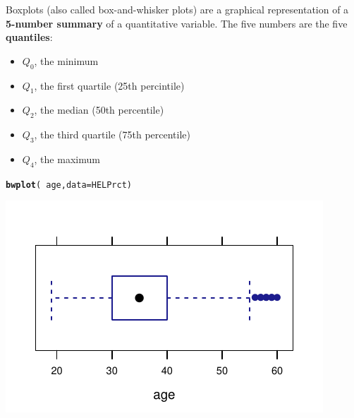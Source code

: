 \documentclass[twoside]{book}\usepackage[]{graphicx}\usepackage[]{xcolor}
\makeatletter
\def\maxwidth{ %
  \ifdim\Gin@nat@width>\linewidth
    \linewidth
  \else
    \Gin@nat@width
  \fi
}
\newcommand{\hlopt}[1]{\textcolor[rgb]{0,0,0}{#1}}%
\newcommand{\hlstd}[1]{\textcolor[rgb]{0.345,0.345,0.345}{#1}}%
\newcommand{\hlkwc}[1]{\textcolor[rgb]{0.333,0.667,0.333}{#1}}%
\newcommand{\hlkwd}[1]{\textcolor[rgb]{0.737,0.353,0.396}{\textbf{#1}}}%
\newenvironment{kframe}{%
 \def\at@end@of@kframe{}%
 \ifinner\ifhmode%
  \def\at@end@of@kframe{\end{minipage}}%
  \begin{minipage}{\columnwidth}%
 \fi\fi%
 \def\FrameCommand##1{\hskip\@totalleftmargin \hskip-\fboxsep
 \colorbox{shadecolor}{##1}\hskip-\fboxsep
     \hskip-\linewidth \hskip-\@totalleftmargin \hskip\columnwidth}%
 \MakeFramed {\advance\hsize-\width
   \@totalleftmargin\z@ \linewidth\hsize
   \@setminipage}}%
 {\par\unskip\endMakeFramed%
 \at@end@of@kframe}
\newenvironment{knitrout}{}{} %
\def\term#1{\textbf{#1}}
\makeatother
\begin{document}
Boxplots (also called box-and-whisker plots) are a graphical representation of a 
\term{5-number summary} of a quantitative variable.  The five numbers are
the five \term{quantiles}:
\begin{itemize}
	\item $Q_0$, the minimum
	\item $Q_1$, the first quartile (25th percintile) 
	\item $Q_2$, the median (50th percentile)
	\item $Q_3$, the third quartile (75th percentile)
	\item $Q_4$, the maximum
\end{itemize}
\begin{knitrout}
\color{fgcolor}\begin{kframe}
\begin{alltt}
\hlkwd{bwplot}\hlstd{(}\hlopt{~}\hlstd{age,} \hlkwc{data}\hlstd{=HELPrct)}
\end{alltt}
\end{kframe}

{\centering \includegraphics[width=\maxwidth]{figures/fig-bwplot-1} 

}



\end{knitrout}
\end{document}
